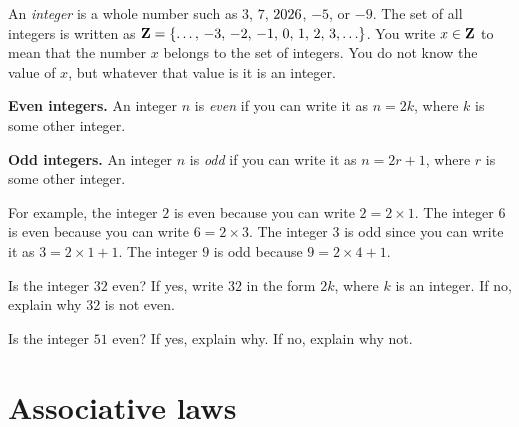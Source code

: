 \documentclass[a4paper,oneside,12pt]{article}
\begin{document}
An \emph{integer} is a whole number such as $3$, $7$, $\the\year$,
$-5$, or $-9$.  The set of all integers is written as
$\ZZ = \set{\dots,\, -3,\, -2,\, -1,\, 0,\, 1,\, 2,\, 3,\dots}$.  You
write $x \in \mathbf{Z}$ to mean that the number $x$ belongs to the set of
integers.  You do not know the value of $x$, but whatever that value
is it is an integer.

\begin{definition}
\textbf{Even integers.}
An integer $n$ is \emph{even} if you can write it as $n = 2k$, where
$k$ is some other integer.
\end{definition}

\begin{definition}
\textbf{Odd integers.}
An integer $n$ is \emph{odd} if you can write it as $n = 2r + 1$,
where $r$ is some other integer.
\end{definition}

For example, the integer $2$ is even because you can write
$2 = 2 \times 1$.  The integer $6$ is even because you can write
$6 = 2 \times 3$.  The integer $3$ is odd since you can write it as
$3 = 2 \times 1 + 1$.  The integer $9$ is odd because
$9 = 2 \times 4 + 1$.

\begin{exercise}
Is the integer $32$ even?  If yes, write $32$ in the form $2k$, where
$k$ is an integer.  If no, explain why $32$ is not even.
\end{exercise}


\begin{exercise}
Is the integer $51$ even?  If yes, explain why.  If no, explain why
not.
\end{exercise}




\section{Associative laws}
\end{document}
